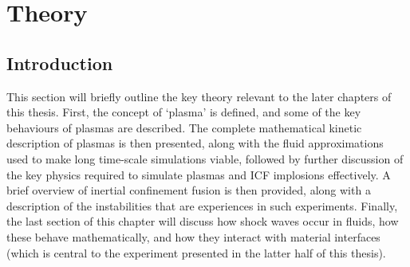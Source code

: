 

\chapter{\label{ch-theory}Theory}

\minitoc

\section{Introduction}
This section will briefly outline the key theory relevant to the later chapters of this thesis. First, the concept of `plasma' is defined, and some of the key behaviours of plasmas are described. The complete mathematical kinetic description of plasmas is then presented, along with the fluid approximations used to make long time-scale simulations viable, followed by further discussion of the key physics required to simulate plasmas and ICF implosions effectively. A brief overview of inertial confinement fusion is then provided, along with a description of the instabilities that are experiences in such experiments. Finally, the last section of this chapter will discuss how shock waves occur in fluids, how these behave mathematically, and how they interact with material interfaces (which is central to the experiment presented in the latter half of this thesis).

